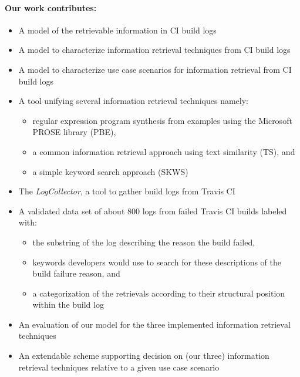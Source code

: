 \documentclass[\myrootdir/main.tex]{subfiles}
\begin{document}
\paragraph{Our work contributes:}
\begin{itemize}
  \item A model of the retrievable information in CI build logs
  \item A model to characterize information retrieval techniques from CI build logs
  \item A model to characterize use case scenarios for information retrieval from CI build logs
  \item A tool unifying several information retrieval techniques namely:
        \begin{itemize}
          \item regular expression program synthesis from examples using the Microsoft PROSE library (PBE),
          \item a common information retrieval approach using text similarity (TS), and
          \item a simple keyword search approach (SKWS)
        \end{itemize}
  \item The \emph{LogCollector}, a tool to gather build logs from Travis CI
  \item A validated data set of about 800 logs from failed Travis CI builds labeled with:
        \begin{itemize}
          \item the substring of the log describing the reason the build failed,
          \item keywords developers would use to search for these descriptions of the build failure reason, and
          \item a categorization of the retrievals according to their structural position within the build log
        \end{itemize}
  \item An evaluation of our model for the three implemented information retrieval techniques 
  \item An extendable scheme supporting decision on (our three) information retrieval techniques relative to a given use case scenario
\end{itemize}
\end{document}
